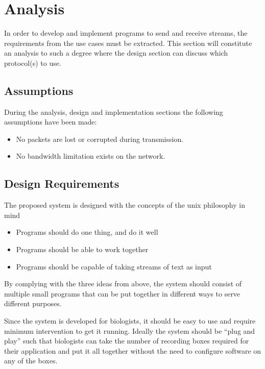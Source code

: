\chapter{Analysis}
In order to develop and implement programs to send and receive streams, the requirements from the use cases must be extracted.
This section will constitute an analysis to such a degree where the design section can discuss which protocol(s) to use.

\section{Assumptions}
During the analysis, design and implementation sections the following assumptions have been made:
\begin{itemize}
	\item No packets are lost or corrupted during transmission.
	\item No bandwidth limitation exists on the network.
\end{itemize}

\section{Design Requirements}
The proposed system is designed with the concepts of the unix philosophy in mind
\begin{itemize}
	\item Programs should do one thing, and do it well
	\item Programs should be able to work together
	\item Programs should be capable of taking streams of text as input
\end{itemize}


By complying with the three ideas from above, the system should consist of multiple small programs that can be put together in different ways to serve different purposes.

Since the system is developed for biologists, it should be easy to use and require minimum intervention to get it running. Ideally the system should be “plug and play” such that biologists can take the number of recording boxes required for their application and put it all together without the need to configure software on any of the boxes. 


